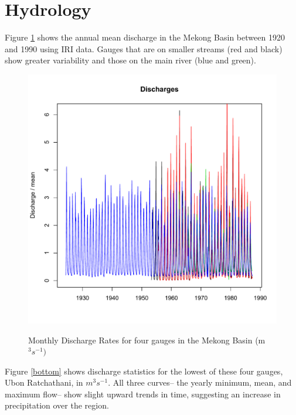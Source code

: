 \documentclass[11pt,english]{article}
\theoremstyle{plain} \newtheorem{claim}{Claim}
\theoremstyle{plain} \newtheorem{prop}{Proposition}
\theoremstyle{plain} \newtheorem{hypo}{Hypothesis}
\begin{document}
\section{Hydrology}

Figure \ref{discharge} shows the annual mean discharge in the Mekong Basin between 1920 and 1990 using IRI data. Gauges that are on smaller streams (red and black) show greater variability and those on the main river (blue and green).

\begin{figure}
\includegraphics{displays/discharge_time.pdf}
\label{discharge}
\caption{Monthly Discharge Rates for four gauges in the Mekong Basin (m$^3 s^{-1})$} 
\end{figure}
 
Figure \ref{bottom} shows discharge statistics for the lowest of these four gauges, Ubon Ratchathani, in $m^3 s^{-1}$. %
All three curves-- the yearly minimum, mean, and maximum flow-- show slight upward trends in time, suggesting an increase in precipitation over the region.
 
\end{document}

